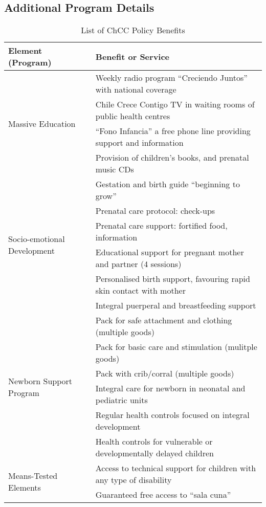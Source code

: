 \documentclass[12pt]{article}
\begin{document}
\begin{spacing}{1.4}
\section{Additional Program Details}
\label{app:program}
\begin{table}[htpb!]
  \caption{List of ChCC Policy Benefits}
  \label{ascn:benefits}
  \begin{tabular}{ll}
    \toprule
    Element (Program) & Benefit or Service \\ \midrule
    \multirow{4}{*}{Massive Education}
    &Weekly radio program ``Creciendo Juntos'' with national coverage\\
    &Chile Crece Contigo TV in waiting rooms of public health centres \\
    & ``Fono Infancia'' a free phone line providing support and information \\
    & Provision of children's books, and prenatal music CDs \\ \midrule
    \multirow{6}{*}{Socio-emotional Development}
    & Gestation and birth guide ``beginning to grow'' \\
    & Prenatal care protocol: check-ups  \\
    & Prenatal care support: fortified food, information\\
    & Educational support for pregnant mother and partner (4 sessions) \\ 
    & Personalised birth support, favouring rapid skin contact with mother \\ 
    & Integral puerperal and breastfeeding support \\ \midrule
    \multirow{6}{*}{Newborn Support Program}
    & Pack for safe attachment and clothing (multiple goods) \\
    & Pack for basic care and stimulation (mulitple goods) \\
    & Pack with crib/corral (multiple goods) \\
    & Integral care for newborn in neonatal and pediatric units \\
    & Regular health controls focused on integral development \\
    & Health controls for vulnerable or developmentally delayed children \\ \midrule
    \multirow{10}{*}{Means-Tested Elements}
    & Access to technical support for children with any type of disability \\
    & Guaranteed free access to ``sala cuna'' \\

\end{tabular}
\end{table}
\end{spacing}
\end{document}
